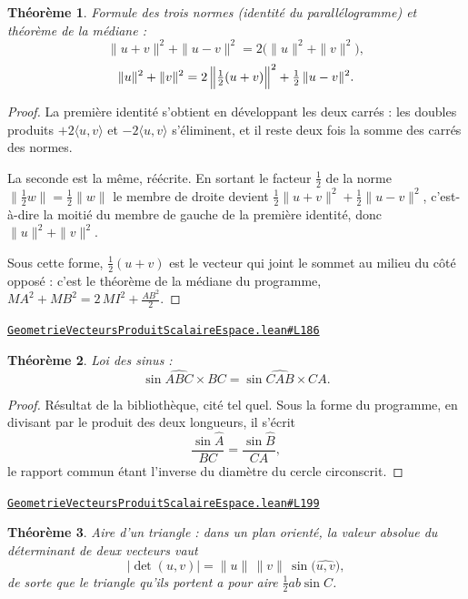 \documentclass[11pt,a4paper]{article}
\theoremstyle{definition}
\theoremstyle{plain}
\newtheorem{theoreme}{Théorème}
\newcommand{\source}[2]{\par\smallskip\noindent\hfill{\footnotesize\href{#1}{\texttt{#2}}}\par\smallskip}
\begin{document}
\begin{theoreme}
Formule des trois normes (identité du parallélogramme) et théorème de la médiane :
\[ \|u + v\|^{2} + \|u - v\|^{2} = 2\bigl(\|u\|^{2} + \|v\|^{2}\bigr) , \]
\[ \|u\|^{2} + \|v\|^{2} = 2\,\Bigl\|\tfrac{1}{2}(u + v)\Bigr\|^{2}
   + \tfrac{1}{2}\,\|u - v\|^{2} . \]
\end{theoreme}

\begin{proof}
La première identité s'obtient en développant les deux carrés : les doubles produits
$+2\langle u, v\rangle$ et $-2\langle u, v\rangle$ s'éliminent, et il reste deux fois la
somme des carrés des normes.

La seconde est la même, réécrite. En sortant le facteur $\frac{1}{2}$ de la norme
\textemdash{} $\|\frac{1}{2}w\| = \frac{1}{2}\|w\|$ \textemdash{} le membre de droite
devient $\frac{1}{2}\|u+v\|^{2} + \frac{1}{2}\|u-v\|^{2}$, c'est-à-dire la moitié du membre
de gauche de la première identité, donc $\|u\|^{2} + \|v\|^{2}$.

\medskip\noindent
Sous cette forme, $\frac{1}{2}(u+v)$ est le vecteur qui joint le sommet au milieu du côté
opposé : c'est le théorème de la médiane du programme,
$MA^{2} + MB^{2} = 2\,MI^{2} + \frac{AB^{2}}{2}$.
\end{proof}
\source{https://github.com/Commutator-IO/learn-lean/blob/main/cours/02-lycee/08-geometrie-vecteurs-produit-scalaire-espace/GeometrieVecteursProduitScalaireEspace.lean\#L186}{GeometrieVecteursProduitScalaireEspace.lean\#L186}

\begin{theoreme}
Loi des sinus :
\[ \sin\widehat{ABC} \times BC = \sin\widehat{CAB} \times CA . \]
\end{theoreme}

\begin{proof}
Résultat de la bibliothèque, cité tel quel. Sous la forme du programme, en divisant par le
produit des deux longueurs, il s'écrit
\[ \frac{\sin \widehat{A}}{BC} = \frac{\sin \widehat{B}}{CA} , \]
le rapport commun étant l'inverse du diamètre du cercle circonscrit.
\end{proof}
\source{https://github.com/Commutator-IO/learn-lean/blob/main/cours/02-lycee/08-geometrie-vecteurs-produit-scalaire-espace/GeometrieVecteursProduitScalaireEspace.lean\#L199}{GeometrieVecteursProduitScalaireEspace.lean\#L199}

\begin{theoreme}
Aire d'un triangle : dans un plan orienté, la valeur absolue du déterminant de deux
vecteurs vaut
\[ |\det(u, v)| = \|u\|\,\|v\|\,\sin\bigl(\widehat{u, v}\bigr) , \]
de sorte que le triangle qu'ils portent a pour aire $\frac{1}{2}ab\sin C$.
\end{theoreme}
\end{document}
